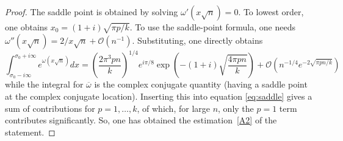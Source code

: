 \documentclass{amsart}
\begin{document}
\begin{proof}
 The saddle point is obtained  by solving $\omega'(x\sqrt{n})=0$.  To
 lowest order, one  obtains $x_{0}=(1+i)\sqrt{\pi  p/k}$. To  use  the
 saddle-point  formula,  one needs
 $\omega''(x\sqrt{n})=2/x\sqrt{n}+\mathcal{O}(n^{-1})$.
 Substituting, one directly obtains 
\begin{equation}
\int_{\sigma_{0}-i\infty}^{\sigma_{0}+i\infty}
\!\!\! e^{\omega(x\sqrt{n})}dx 
=\left(\frac{2\pi^{3}pn}{k}\right)^{1/4}\!\!\!e^{i\pi/8}
\exp\!\left(-(1+i)\sqrt{\frac{4\pi pn}{k}}\right)\! {}
+\mathcal{O}\left(n^{-1/4}e^{-2\sqrt{\pi pn/k}}\right)
\end{equation}
 while the integral for $\overline{\omega}$ is the complex conjugate 
quantity (having a saddle point at the complex conjugate location). Inserting
this into equation \eqref{eq:saddle} gives a sum of contributions for $p=1,\ldots,k$,
of which, 
for large $n$, only the $p=1$ term contributes significantly.
So, one has obtained the estimation~\eqref{A2} of the statement.
\end{proof}

\end{document}
